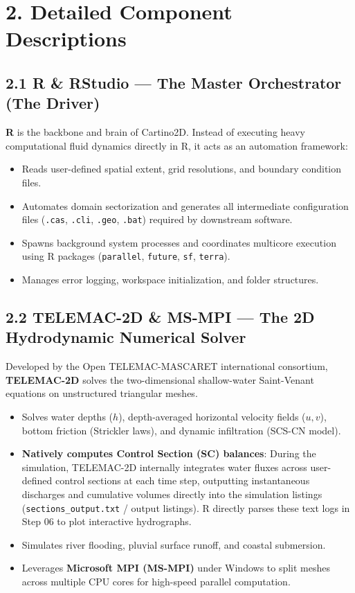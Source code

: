 \documentclass[10pt,a4paper]{article}
\begin{document}
\vspace{1.2em}

\section*{2. Detailed Component Descriptions}

\subsection*{2.1 R \& RStudio — The Master Orchestrator (The Driver)}
\textbf{R} is the backbone and brain of Cartino2D. Instead of executing heavy computational fluid dynamics directly in R, it acts as an automation framework:
\begin{itemize}[leftmargin=1.5em, itemsep=2pt, topsep=2pt]
  \item Reads user-defined spatial extent, grid resolutions, and boundary condition files.
  \item Automates domain sectorization and generates all intermediate configuration files (\texttt{.cas}, \texttt{.cli}, \texttt{.geo}, \texttt{.bat}) required by downstream software.
  \item Spawns background system processes and coordinates multicore execution using R packages (\texttt{parallel}, \texttt{future}, \texttt{sf}, \texttt{terra}).
  \item Manages error logging, workspace initialization, and folder structures.
\end{itemize}

\subsection*{2.2 TELEMAC-2D \& MS-MPI — The 2D Hydrodynamic Numerical Solver}
Developed by the Open TELEMAC-MASCARET international consortium, \textbf{TELEMAC-2D} solves the two-dimensional shallow-water Saint-Venant equations on unstructured triangular meshes.
\begin{itemize}[leftmargin=1.5em, itemsep=2pt, topsep=2pt]
  \item Solves water depths ($h$), depth-averaged horizontal velocity fields ($u, v$), bottom friction (Strickler laws), and dynamic infiltration (SCS-CN model).
  \item \textbf{Natively computes Control Section (SC) balances}: During the simulation, TELEMAC-2D internally integrates water fluxes across user-defined control sections at each time step, outputting instantaneous discharges and cumulative volumes directly into the simulation listings (\texttt{sections\_output.txt} / output listings). R directly parses these text logs in Step 06 to plot interactive hydrographs.
  \item Simulates river flooding, pluvial surface runoff, and coastal submersion.
  \item Leverages \textbf{Microsoft MPI (MS-MPI)} under Windows to split meshes across multiple CPU cores for high-speed parallel computation.
\end{itemize}
\end{document}
